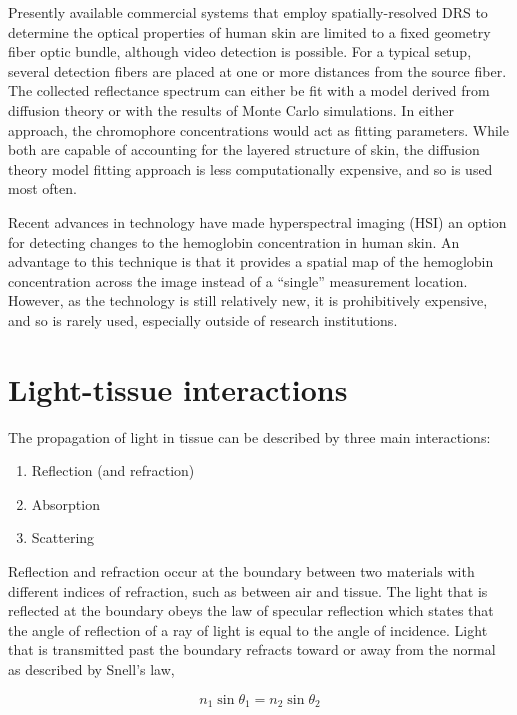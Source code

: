Presently available commercial systems that employ spatially-resolved DRS to determine the optical properties of human skin are limited to a fixed geometry fiber optic bundle, although video detection is possible. For a typical setup, several detection fibers are placed at one or more distances from the source fiber. The collected reflectance spectrum can either be fit with a model derived from diffusion theory or with the results of Monte Carlo simulations.\cite{Nishidate2011a} In either approach, the chromophore concentrations would act as fitting parameters. While both are capable of accounting for the layered structure of skin, the diffusion theory model fitting approach is less computationally expensive, and so is used most often.\cite{Zonios2001,Zonios2009,Reif2011,Tseng2012}

Recent advances in technology have made hyperspectral imaging (HSI) an option for detecting changes to the hemoglobin concentration in human skin.\cite{Yudovsky2010,Chin2012} An advantage to this technique is that it provides a spatial map of the hemoglobin concentration across the image instead of a ``single'' measurement location. However, as the technology is still relatively new, it is prohibitively expensive, and so is rarely used, especially outside of research institutions.

\section{Light-tissue interactions}
The propagation of light in tissue can be described by three main interactions:\cite{Niemz2007}
\begin{enumerate}
	\item Reflection (and refraction)
	\item Absorption
	\item Scattering
\end{enumerate}

Reflection and refraction occur at the boundary between two materials with different indices of refraction, such as between air and tissue. The light that is reflected at the boundary obeys the law of specular reflection which states that the angle of reflection of a ray of light is equal to the angle of incidence.\cite{Knight2013} Light that is transmitted past the boundary refracts toward or away from the normal as described by Snell's law,

\begin{equation}
n_1 \sin \theta_1 = n_2 \sin \theta_2
\end{equation}


